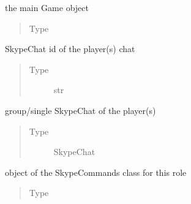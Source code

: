 \documentclass[letterpaper,10pt,english]{sphinxmanual}
\begin{document}
\begin{fulllineitems}
\begin{fulllineitems}
\begin{quote}
\begin{description}
\end{description}\end{quote}

\end{fulllineitems}



\begin{fulllineitems}
the main Game object
\begin{quote}\begin{description}
\item[{Type}] \leavevmode
{\hyperref[\detokenize{chatwolf:chatwolf.game.Game}]{}}

\end{description}\end{quote}

\end{fulllineitems}



\begin{fulllineitems}
SkypeChat id of the player(s) chat
\begin{quote}\begin{description}
\item[{Type}] \leavevmode
str

\end{description}\end{quote}

\end{fulllineitems}



\begin{fulllineitems}
group/single SkypeChat of the player(s)
\begin{quote}\begin{description}
\item[{Type}] \leavevmode
SkypeChat

\end{description}\end{quote}

\end{fulllineitems}



\begin{fulllineitems}
object of the SkypeCommands class for this role
\begin{quote}\begin{description}
\item[{Type}] \leavevmode
{\hyperref[\detokenize{chatwolf:chatwolf.skypecommands.SkypeCommands}]{}}


\end{description}
\end{quote}
\end{fulllineitems}
\end{fulllineitems}
\end{document}
